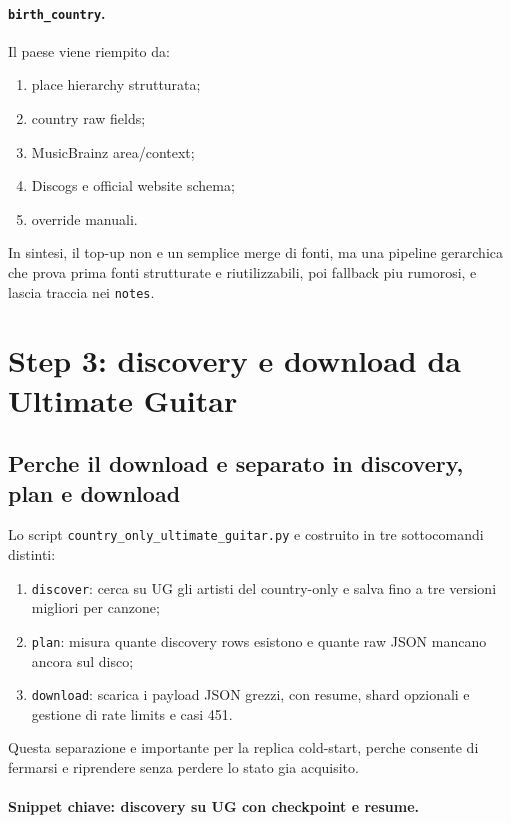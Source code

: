 \documentclass[11pt]{article}
\begin{document}
\paragraph{\texttt{birth\_country}.}
Il paese viene riempito da:
\begin{enumerate}[leftmargin=2em]
\item place hierarchy strutturata;
\item country raw fields;
\item MusicBrainz area/context;
\item Discogs e official website schema;
\item override manuali.
\end{enumerate}

In sintesi, il top-up non e un semplice merge di fonti, ma una pipeline gerarchica che prova prima fonti strutturate e riutilizzabili, poi fallback piu rumorosi, e lascia traccia nei \texttt{notes}.

\section{Step 3: discovery e download da Ultimate Guitar}
\subsection{Perche il download e separato in discovery, plan e download}
Lo script \texttt{country\_only\_ultimate\_guitar.py} e costruito in tre sottocomandi distinti:
\begin{enumerate}[leftmargin=2em]
\item \texttt{discover}: cerca su UG gli artisti del country-only e salva fino a tre versioni migliori per canzone;
\item \texttt{plan}: misura quante discovery rows esistono e quante raw JSON mancano ancora sul disco;
\item \texttt{download}: scarica i payload JSON grezzi, con resume, shard opzionali e gestione di rate limits e casi 451.
\end{enumerate}

Questa separazione e importante per la replica cold-start, perche consente di fermarsi e riprendere senza perdere lo stato gia acquisito.

\paragraph{Snippet chiave: discovery su UG con checkpoint e resume.}

\end{document}
